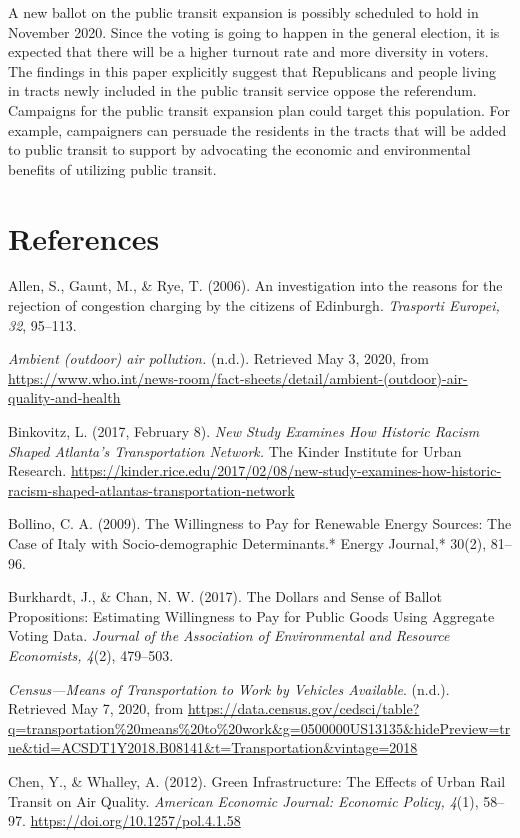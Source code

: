 \documentclass[
]{article}
\begin{document}
A new ballot on the public transit expansion is possibly scheduled to
hold in November 2020. Since the voting is going to happen in the
general election, it is expected that there will be a higher turnout
rate and more diversity in voters. The findings in this paper explicitly
suggest that Republicans and people living in tracts newly included in
the public transit service oppose the referendum. Campaigns for the
public transit expansion plan could target this population. For example,
campaigners can persuade the residents in the tracts that will be added
to public transit to support by advocating the economic and
environmental benefits of utilizing public transit.

\hypertarget{references}{%
\section{References}\label{references}}

Allen, S., Gaunt, M., \& Rye, T. (2006). An investigation into the
reasons for the rejection of congestion charging by the citizens of
Edinburgh. \emph{Trasporti Europei, 32}, 95--113.

\emph{Ambient (outdoor) air pollution.} (n.d.). Retrieved May 3, 2020,
from
\url{https://www.who.int/news-room/fact-sheets/detail/ambient-(outdoor)-air-quality-and-health}

Binkovitz, L. (2017, February 8). \emph{New Study Examines How Historic
Racism Shaped Atlanta's Transportation Network.} The Kinder Institute
for Urban Research.
\url{https://kinder.rice.edu/2017/02/08/new-study-examines-how-historic-racism-shaped-atlantas-transportation-network}

Bollino, C. A. (2009). The Willingness to Pay for Renewable Energy
Sources: The Case of Italy with Socio-demographic Determinants.* Energy
Journal,* 30(2), 81--96.

Burkhardt, J., \& Chan, N. W. (2017). The Dollars and Sense of Ballot
Propositions: Estimating Willingness to Pay for Public Goods Using
Aggregate Voting Data. \emph{Journal of the Association of Environmental
and Resource Economists, 4}(2), 479--503.

\emph{Census---Means of Transportation to Work by Vehicles Available}.
(n.d.). Retrieved May 7, 2020, from
\url{https://data.census.gov/cedsci/table?q=transportation\%20means\%20to\%20work\&g=0500000US13135\&hidePreview=true\&tid=ACSDT1Y2018.B08141\&t=Transportation\&vintage=2018}

Chen, Y., \& Whalley, A. (2012). Green Infrastructure: The Effects of
Urban Rail Transit on Air Quality. \emph{American Economic Journal:
Economic Policy, 4}(1), 58--97. \url{https://doi.org/10.1257/pol.4.1.58}
\end{document}
